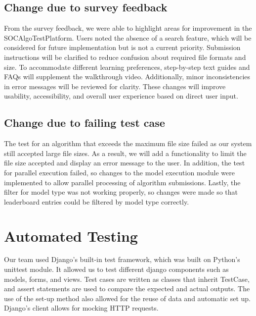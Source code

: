 \documentclass[12pt, titlepage]{article}
\begin{document}
\subsection{Change due to survey feedback}
From the survey feedback, we were able to highlight areas for improvement in the SOCAlgoTestPlatform. Users noted the absence of a search feature, which will be considered for future implementation but is not a current priority. Submission instructions will be clarified to reduce confusion about required file formats and size. To accommodate different learning preferences, step-by-step text guides and FAQs will supplement the walkthrough video. Additionally, minor inconsistencies in error messages will be reviewed for clarity. These changes will improve usability, accessibility, and overall user experience based on direct user input.

\subsection{Change due to failing test case}
The test for an algorithm that exceeds the maximum file size failed as our system still accepted large file sizes. As a result, we will add a functionality to limit the file size accepted and display an error message to the user. In addition, the test for parallel execution failed, so changes to the model execution module were implemented to allow parallel processing of algorithm submissions. Lastly, the filter for model type was not working properly, so changes were made so that leaderboard entries could be filtered by model type correctly.

\section{Automated Testing}
Our team used Django's built-in test framework, which was built on Python's unittest module. It allowed us to test different django components such as models, forms, and views. Test cases are written as classes that inherit TestCase, and assert statements are used to compare the expected and actual outputs. The use of the set-up method also allowed for the reuse of data and automatic set up. Django's client allows for mocking HTTP requests.

        
\end{document}

